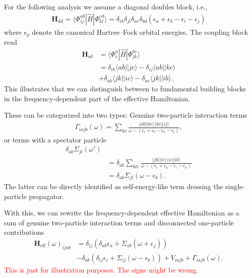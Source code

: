 \documentclass[aip,jcp,reprint,noshowkeys,superscriptaddress]{revtex4-1}
\begin{document}
For the following analysis we assume a diagonal doubles block, i.e.,
\begin{align}
\mathbf{H}_{\text{dd}} = \langle \Phi_{ij}^{ab} | \hat{H} | \Phi_{kl}^{cd} \rangle = \delta_{ik} \delta_{jl} \delta_{ac} \delta_{bd} (\epsilon_a + \epsilon_b - \epsilon_i - \epsilon_j)
\end{align}
where $\epsilon_p$ denote the canonical Hartree--Fock orbital energies.
The coupling block read
\begin{align}
  \mathbf{H}_{\text{sd}} &= \langle \Phi_i^a | \hat{H} | \Phi_{jk}^{bc} \rangle  \nonumber \\
  &= \delta_{ik} \langle ab||jc \rangle - \delta_{ij} \langle ab||kc \rangle\nonumber \\
  &+ \delta_{ab} \langle jk||ic \rangle - \delta_{ac} \langle jk||ib \rangle .
\end{align}
This illustrates that we can distinguish between to fundamental building blocks in the frequency-dependent part of the effective Hamiltonian.

These can be categorized into two types:
Genuine two-particle interaction terms
\begin{align}
   \Gamma_{iajb}(\omega) = \sum_{kc} \frac{\langle ab||kc \rangle \langle kc||ij \rangle}{\omega - (\epsilon_c + \epsilon_b - \epsilon_k - \epsilon_i)},
\end{align}
or terms with a spectator particle 
\begin{align}
  \delta_{ab} \Sigma_{jl}(\omega') \nonumber \\
  &= \delta_{ab} \sum_{klc} \frac{\langle jk||ic \rangle \langle ic||kl \rangle}{\omega - (\epsilon_c + \epsilon_b - \epsilon_i - \epsilon_k)} \nonumber \\
  &= \delta_{ab} \Sigma_{jl}(\omega - \epsilon_b).
\end{align}
The latter can be directly identified as self-energy-like term dressing the single-particle propagator.

With this, we can rewrite the frequency-dependent effective Hamiltonian as a sum of genuine two-particle interaction terms and disconnected one-particle contributions
\begin{align}
\mathbf{H}_{\text{eff}}(\omega)_{ijab} &= \delta_{ij} \left( \delta_{ab} \epsilon_a + \Sigma_{ab}(\omega + \epsilon_j) \right) \nonumber \\
&- \delta_{ab} \left(\delta_{ij} \epsilon_i +  \Sigma_{ij}(\omega - \epsilon_b) \right) + V_{iajb} + \Gamma_{iajb}(\omega).
\end{align}
\textcolor{red}{This is just for illustration purposes. The signs might be wrong.}
\end{document}

